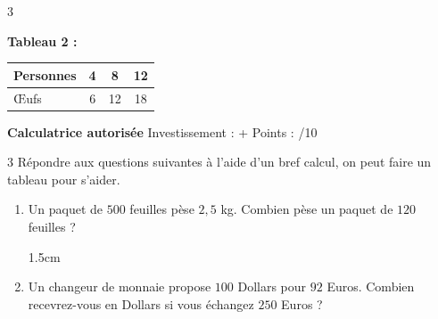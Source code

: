 \documentclass[a4paper]{book}
\begin{document}
{\begin{exerciceNote}{3}
\begin{minipage}{0.45\linewidth}
            \dotfill
                                    
            \medskip 
            
            \dotfill
        \end{minipage}
        \hfill\vline\hfill
        \begin{minipage}{0.45\linewidth}
            \begin{center}
                \textbf{Tableau 2 :} \begin{tabular}{|l|c|c|c|} 
                \hline Personnes & 4 & 8 & 12 \\ 
                \hline Œufs & 6 & 12 & 18 \\ \hline 
                \end{tabular}
            \end{center}

            \medskip
            
            \dotfill 
            
            \medskip 
            
            \dotfill
                        
            \medskip 
            
            \dotfill
        \end{minipage}      
    \end{exerciceNote}
    

\newpage

\raggedright
\NomPrenom  \hfill \textbf{Calculatrice autorisée} \hfill  Investissement : + \quad \quad \quad Points : \quad \quad /10

    \begin{exerciceNote}{3}
        Répondre aux questions suivantes à l'aide d'un bref calcul, on peut faire un tableau pour s'aider.

        \begin{enumerate}[leftmargin=*]
            \item Un paquet de $500$ feuilles pèse $2,5$ kg. Combien pèse un paquet de $120$ feuilles ?

            \begin{ZoneReponse}{1.5cm}                
            \end{ZoneReponse}

            \item Un changeur de monnaie propose $100$ Dollars pour $92$ Euros. Combien recevrez-vous en Dollars si vous échangez $250$ Euros ?


\end{enumerate}
\end{exerciceNote}}
\end{document}
